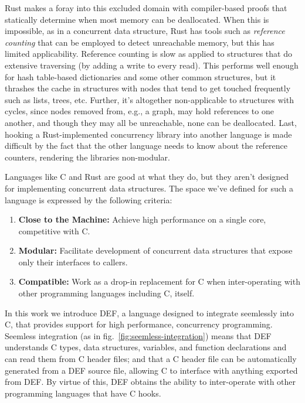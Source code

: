 Rust makes a foray into this excluded domain with compiler-based proofs that statically determine when most memory can be deallocated.\cite{Rust}  When this is impossible, as in a concurrent data structure, Rust has tools such as \textit{reference counting} that can be employed to detect unreachable memory, but this has limited applicability.  Reference counting is slow as applied to structures that do extensive traversing (by adding a write to every read).  This performs well enough for hash table-based dictionaries and some other common structures, but it thrashes the cache in structures with nodes that tend to get touched frequently such as lists, trees, etc.  Further, it's altogether non-applicable to structures with cycles, since nodes removed from, e.g., a graph, may hold references to one another, and though they may all be unreachable, none can be deallocated.  Last, hooking a Rust-implemented concurrency library into another language is made difficult by the fact that the other language needs to know about the reference counters, rendering the libraries non-modular.

Languages like C and Rust are good at what they do, but they aren't designed for implementing concurrent data structures.  The space we've defined for such a language is expressed by the following criteria:

\begin{enumerate}
        \item \textbf{Close to the Machine:} Achieve high performance on a single core, competitive with C.
        \item \textbf{Modular:} Facilitate development of concurrent data structures that expose only their interfaces to callers.
        \item \textbf{Compatible:} Work as a drop-in replacement for C when inter-operating with other programming languages including C, itself.
\end{enumerate}

In this work we introduce DEF, a language designed to integrate seemlessly into C, that provides support for high performance, concurrency programming.  Seemless integration (as in fig.~\ref{fig:seemless-integration}) means that DEF understands C types, data structures, variables, and function declarations and can read them from C header files; and that a C header file can be automatically generated from a DEF source file, allowing C to interface with anything exported from DEF.  By virtue of this, DEF obtains the ability to inter-operate with other programming languages that have C hooks.

